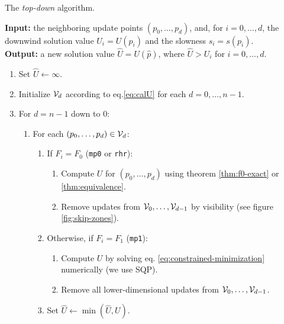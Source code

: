 \documentclass[smallcondensed]{svjour3}
\begin{document}
\begin{algorithm}[t]
  \caption{The \emph{top-down} algorithm.}\label{alg:top-down}
  \textbf{Input:} the neighboring update points $(p_0, \hdots, p_d)$,
  and, for $i = 0, \hdots, d$, the downwind solution value
  $U_i = U(p_i)$ and the slowness $s_i = s(p_i)$. \\
  \textbf{Output:} a new solution value $\hat{U} = U(\hat{p})$, where
  $\hat{U} > U_i$ for $i = 0, \hdots, d$.
  \begin{enumerate}[nolistsep]
  \item Set $\hat{U} \gets \infty$.
  \item Initialize $\mathcal{V}_d$ according to eq.\@ \ref{eq:calU} for
    each $d = 0, \hdots, n - 1$.
  \item For $d = n - 1$ down to $0$:
    \begin{enumerate}
    \item For each $(p_0, \hdots, p_d) \in \mathcal{V}_d$:
      \begin{enumerate}
      \item If $F_i = F_0$ (\texttt{mp0} or \texttt{rhr}):
        \begin{enumerate}
        \item Compute $U$ for $(p_0, \hdots, p_{d})$ using theorem
          \ref{thm:f0-exact} or \ref{thm:equivalence}.
        \item Remove updates from $\mathcal{V}_0, \hdots, \mathcal{V}_{d-1}$ by
          visibility (see figure \ref{fig:skip-zones}).
        \end{enumerate}
      \item Otherwise, if $F_i = F_1$ (\texttt{mp1}):
        \begin{enumerate}
        \item Compute $U$ by solving eq.\@
          \ref{eq:constrained-minimization} numerically (we use SQP).
        \item Remove all lower-dimensional updates from
          $\mathcal{V}_0, \hdots, \mathcal{V}_{d-1}$.
        \end{enumerate}
      \item Set $\hat{U} \gets \min(\hat{U}, U)$.
      \end{enumerate}
    \end{enumerate}
  \end{enumerate}
\end{algorithm}
\end{document}
